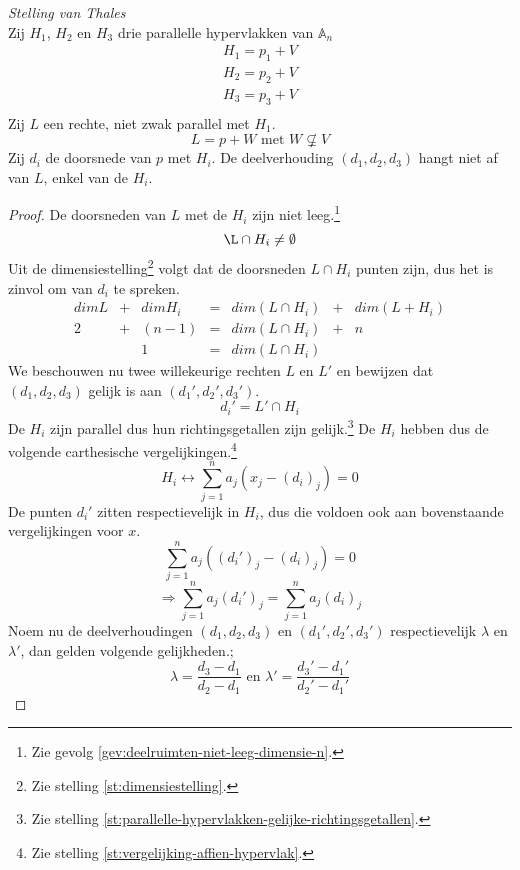\documentclass[main.tex]{subfiles}
\begin{document}
\begin{st}
  \label{st:stelling-van-thales}
  \emph{Stelling van Thales}\\
  Zij $H_{1}$, $H_{2}$ en $H_{3}$ drie parallelle hypervlakken van $\mathbb{A}_{n}$
  \[
  \begin{array}{rl}
    H_{1} = p_{1} + V\\
    H_{2} = p_{2} + V\\
    H_{3} = p_{3} + V\\
  \end{array}
  \]
  Zij $L$ een rechte, niet zwak parallel met $H_{1}$.
  \[ L = p + W \text{ met } W \not\subsetneq V \]
  Zij $d_{i}$ de doorsnede van $p$ met $H_{i}$.
  De deelverhouding $(d_1,d_2,d_3)$ hangt niet af van $L$, enkel van de $H_{i}$.
 
  \begin{proof}
    De doorsneden van $L$ met de $H_{i}$ zijn niet leeg.\footnote{Zie gevolg \ref{gev:deelruimten-niet-leeg-dimensie-n}.}
    \[ \L \cap H_{i} \neq \emptyset \]
    Uit de dimensiestelling\footnote{Zie stelling \ref{st:dimensiestelling}.} volgt dat de doorsneden $L\cap H_{i}$ punten zijn, dus het is zinvol om van $d_{i}$ te spreken.
    \[
    \begin{array}{cccccccc}
    dim L &+& dim H_{i} &=& dim(L \cap H_{i}) &+& dim(L + H_{i})\\
    2     &+& (n-1)    &=& dim(L \cap H_{i}) &+& n\\
          & & 1        &=& dim(L \cap H_{i})
    \end{array}
    \] 
    We beschouwen nu twee willekeurige rechten $L$ en $L'$ en bewijzen dat $(d_1,d_2,d_3)$ gelijk is aan $(d_1',d_2',d_3')$.
    \[ d_{i}' = L' \cap H_{i} \]
    De $H_{i}$ zijn parallel dus hun richtingsgetallen zijn gelijk.\footnote{Zie stelling \ref{st:parallelle-hypervlakken-gelijke-richtingsgetallen}.}
    De $H_{i}$ hebben dus de volgende carthesische vergelijkingen.\footnote{Zie stelling \ref{st:vergelijking-affien-hypervlak}.}
    \[ H_{i} \leftrightarrow \sum_{j=1}^{n}a_{j}(x_{j}-(d_{i})_{j}) = 0 \]
    De punten $d_{i}'$ zitten respectievelijk in $H_{i}$, dus die voldoen ook aan bovenstaande vergelijkingen voor $x$.
    \[ \sum_{j=1}^{n}a_{j}((d_{i}')_{j}-(d_{i})_{j}) = 0 \]
    \[ \Rightarrow \sum_{j=1}^{n}a_{j}(d_{i}')_{j} = \sum_{j=1}^{n}a_{j}(d_{i})_{j}\]
    Noem nu de deelverhoudingen $(d_1,d_2,d_3)$ en $(d_1',d_2',d_3')$ respectievelijk $\lambda$ en $\lambda'$, dan gelden volgende gelijkheden.;
    \[ \lambda = \frac{d_{3}-d_{1}}{d_{2}-d_{1}} \text{ en } \lambda' = \frac{d_{3}'-d_{1}'}{d_{2}'-d_{1}'} \]

\end{proof}
\end{st}
\end{document}
